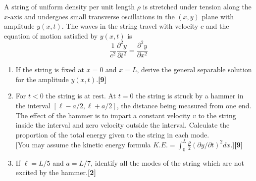 \documentclass[a4paper]{article}
\begin{document}
\begin{qns}
A string of uniform density per unit length $\rho$ is stretched under tension along the $x$-axis and undergoes small transverse oscillations in the $(x, y)$ plane with amplitude $y(x, t)$. The waves in the string travel with velocity $c$ and the equation of motion satisfied by $y(x, t)$ is
$$\frac{1}{c^2}\frac{\partial^2y}{\partial t^2}=\frac{\partial^2y}{\partial x^2}$$
\begin{enumerate}[label=(\alph*)]
\item If the string is fixed at $x = 0$ and $x = L$, derive the general separable solution for the amplitude $y(x, t)$.\hfill\textbf{[9]}
\item For $t < 0$ the string is at rest. At $t = 0$ the string is struck by a hammer in the interval $[\ell-a/2,\ell+a/2]$, the distance being measured from one end. The effect of the hammer is to impart a constant velocity $v$ to the string inside the interval and zero velocity outside the interval. Calculate the proportion of the total energy given to the string in each mode.\\[5pt]
[You may assume the kinetic energy formula $K.E.=\int_0^L\frac{\rho}{2}(\partial y/\partial t)^2dx$.]\hfill\textbf{[9]}
\item If $\ell=L/5$ and $a = L/7$, identify all the modes of the string which are not excited by the hammer.\hfill\textbf{[2]}
\end{enumerate}
\end{qns}
\end{document}
